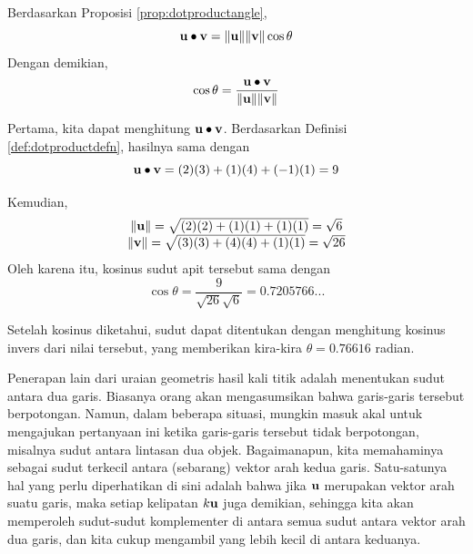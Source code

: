 \begin{solution}
Berdasarkan Proposisi \ref{prop:dotproductangle},
\begin{equation*}
\mathbf{u}\bullet \mathbf{v}=\| \mathbf{u}\| \| \mathbf{v}
\| \cos \theta
\end{equation*}
Dengan demikian,
\begin{equation*}
\cos \theta =\frac{\mathbf{u}\bullet \mathbf{v}}{\| \mathbf{u}\| \| \mathbf{v}
\|}
\end{equation*}

Pertama, kita dapat menghitung $\mathbf{u}\bullet \mathbf{v}$. Berdasarkan Definisi \ref{def:dotproductdefn}, hasilnya sama dengan
\begin{equation*}
\mathbf{u}\bullet \mathbf{v}
=
(2)(3) + (1)(4)+(-1)(1) = 9
\end{equation*}

Kemudian,
\begin{equation*}
\begin{array}{c}
\| \mathbf{u} \|
=
\sqrt{(2)(2)+(1)(1)+(1)(1)}=\sqrt{6}\\
\|  \mathbf{v} \|
=
\sqrt{(3)(3)+(4)(4)+(1)(1)}=\sqrt{26}
\end{array}
\end{equation*}
Oleh karena itu, kosinus sudut apit tersebut sama dengan
\begin{equation*}
\cos \theta =\frac{9}{\sqrt{26}\sqrt{6}}=0.7205766...
\end{equation*}

Setelah kosinus diketahui, sudut dapat ditentukan dengan menghitung
kosinus invers dari nilai tersebut, yang memberikan kira-kira $\theta =0.76616$ radian.
\end{solution}

Penerapan lain dari uraian geometris hasil kali titik adalah
menentukan sudut antara dua garis. Biasanya orang akan mengasumsikan bahwa
garis-garis tersebut berpotongan. Namun, dalam beberapa situasi, mungkin masuk akal untuk mengajukan
pertanyaan ini ketika garis-garis tersebut tidak berpotongan, misalnya sudut antara
lintasan dua objek. Bagaimanapun, kita memahaminya sebagai sudut
terkecil antara (sebarang) vektor arah kedua garis. Satu-satunya
hal yang perlu diperhatikan di sini adalah bahwa jika $\mathbf{u}$ merupakan vektor arah suatu garis,
maka setiap kelipatan $k\mathbf{u}$ juga demikian, sehingga kita akan memperoleh sudut-sudut komplementer
di antara semua sudut antara vektor arah dua garis, dan kita
cukup mengambil yang lebih kecil di antara keduanya.

